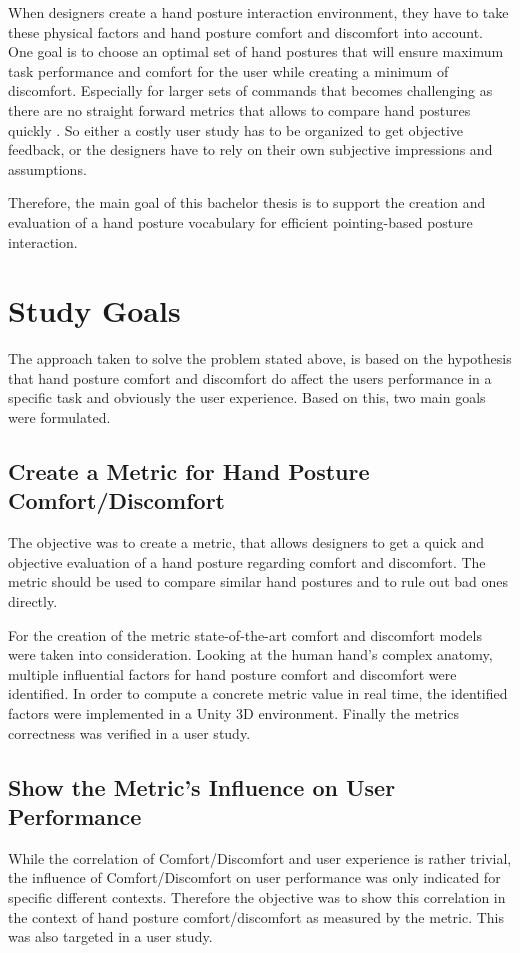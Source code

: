 When designers create a hand posture interaction environment, they have to take these physical factors and hand posture comfort and discomfort into account. One goal is to choose an optimal set of hand postures that will ensure maximum task performance and comfort for the user while creating a minimum of discomfort. Especially for larger sets of commands that becomes challenging as there are no straight forward metrics that allows to compare hand postures quickly \cite{naddeo2015proposal}. So either a costly user study has to be organized to get objective feedback, or the designers have to rely on their own subjective impressions and assumptions.

Therefore, the main goal of this bachelor thesis is to support the creation and evaluation of a hand posture vocabulary for efficient pointing-based posture interaction.

\section{Study Goals}

The approach taken to solve the problem stated above, is based on the hypothesis that hand posture comfort and discomfort do affect the users performance in a specific task and obviously the user experience. Based on this, two main goals were formulated.

\subsection{Create a Metric for Hand Posture Comfort/Discomfort}

The objective was to create a metric, that allows designers to get a quick and objective evaluation of a hand posture regarding comfort and discomfort. The metric should be used to compare similar hand postures and to rule out bad ones directly. 

For the creation of the metric state-of-the-art comfort and discomfort models were taken into consideration. Looking at the human hand's complex anatomy, multiple influential factors for hand posture comfort and discomfort were identified. In order to compute a concrete metric value in real time, the identified factors were implemented in a Unity 3D environment. Finally the metrics correctness was verified in a user study.

\subsection{Show the Metric's Influence on User Performance}

While the correlation of Comfort/Discomfort and user experience is rather trivial, the influence of Comfort/Discomfort on user performance was only indicated for specific different contexts. Therefore the objective was to show this correlation in the context of hand posture comfort/discomfort as measured by the metric. This was also targeted in a user study. 